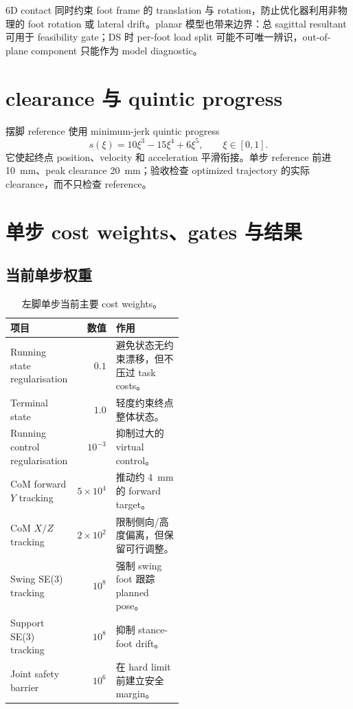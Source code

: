 \documentclass[UTF8,11pt,a4paper]{ctexart}
\begin{document}
6D contact 同时约束 foot frame 的 translation 与 rotation，防止优化器利用非物理的 foot rotation 或 lateral drift。planar 模型也带来边界：总 sagittal resultant 可用于 feasibility gate；DS 时 per-foot load split 可能不可唯一辨识，out-of-plane component 只能作为 model diagnostic。

\section{clearance 与 quintic progress}\label{sec:quintic}

摆脚 reference 使用 minimum-jerk quintic progress
\begin{equation}
 s(\xi)=10\xi^3-15\xi^4+6\xi^5,\qquad \xi\in[0,1].
\end{equation}
它使起终点 position、velocity 和 acceleration 平滑衔接。单步 reference 前进 \SI{10}{mm}、peak clearance \SI{20}{mm}；验收检查 optimized trajectory 的实际 clearance，而不只检查 reference。

\section{单步 cost weights、gates 与结果}\label{sec:weights_results}

\subsection{当前单步权重}

\begin{table}[htbp]
\centering
\caption{左脚单步当前主要 cost weights。}
\begin{tabular}{@{}lrp{0.50\linewidth}@{}}
\toprule
项目 & 数值 & 作用 \\
\midrule
Running state regularisation & $0.1$ & 避免状态无约束漂移，但不压过 task costs。\\
Terminal state & $1.0$ & 轻度约束终点整体状态。\\
Running control regularisation & $10^{-3}$ & 抑制过大的 virtual control。\\
CoM forward $Y$ tracking & $5\times10^4$ & 推动约 \SI{4}{\milli\metre} 的 forward target。\\
CoM $X/Z$ tracking & $2\times10^2$ & 限制侧向/高度偏离，但保留可行调整。\\
Swing SE(3) tracking & $10^8$ & 强制 swing foot 跟踪 planned pose。\\
Support SE(3) tracking & $10^8$ & 抑制 stance-foot drift。\\
Joint safety barrier & $10^6$ & 在 hard limit 前建立安全 margin。\\
\bottomrule
\end{tabular}
\end{table}
\end{document}
